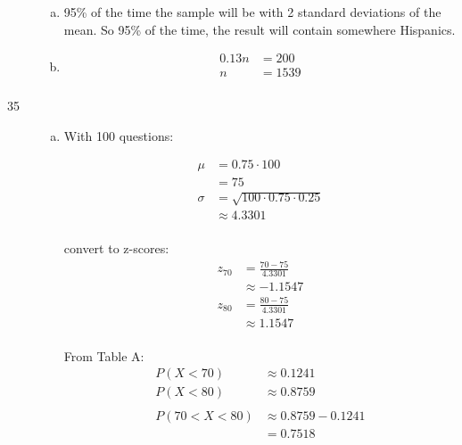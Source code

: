 \documentclass[letterpaper, landscape]{exam}
\begin{document}
\begin{description}
\begin{enumerate}[(a)]
          \item 95\% of the time the sample will be with 2 standard deviations
            of the mean. So 95\% of the time, the result will contain somewhere
             Hispanics.

          \item 
            \begin{align*}
              0.13 n & = 200 \\
              n      & = \boxed{ 1539 } \\
            \end{align*}
        
        \end{enumerate}

      \item[35]
        \begin{enumerate}[(a)]
          \item
            With 100 questions:

            \begin{align*}
              \mu    & = 0.75 \cdot 100 \\
                     & = 75 \\
              \sigma & = \sqrt{100 \cdot 0.75 \cdot 0.25} \\
                     & \approx 4.3301 \\
            \end{align*}

            convert to z-scores:
            \begin{align*}
              z_{70} & = \frac{70 - 75}{4.3301} \\
                     & \approx -1.1547 \\
              z_{80} & = \frac{80 - 75}{4.3301} \\
                     & \approx 1.1547 \\
            \end{align*}

            From Table A:
            \begin{align*}
              P(X < 70) & \approx 0.1241 \\
              P(X < 80) & \approx 0.8759 \\
              \\
              P(70 < X < 80) & \approx 0.8759 - 0.1241 \\
                             & = \boxed{ 0.7518 } \\
            \end{align*}


\end{enumerate}
\end{description}
\end{document}
